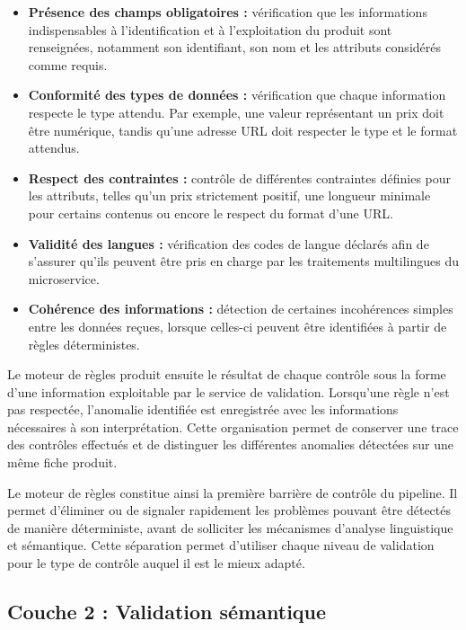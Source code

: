\begin{itemize}
    \item \textbf{Présence des champs obligatoires :} vérification que les informations indispensables à l'identification et à l'exploitation du produit sont renseignées, notamment son identifiant, son nom et les attributs considérés comme requis.

    \item \textbf{Conformité des types de données :} vérification que chaque information respecte le type attendu. Par exemple, une valeur représentant un prix doit être numérique, tandis qu'une adresse URL doit respecter le type et le format attendus.

    \item \textbf{Respect des contraintes :} contrôle de différentes contraintes définies pour les attributs, telles qu'un prix strictement positif, une longueur minimale pour certains contenus ou encore le respect du format d'une URL.

    \item \textbf{Validité des langues :} vérification des codes de langue déclarés afin de s'assurer qu'ils peuvent être pris en charge par les traitements multilingues du microservice.

    \item \textbf{Cohérence des informations :} détection de certaines incohérences simples entre les données reçues, lorsque celles-ci peuvent être identifiées à partir de règles déterministes.
\end{itemize}

Le moteur de règles produit ensuite le résultat de chaque contrôle sous la forme d'une information exploitable par le service de validation. Lorsqu'une règle n'est pas respectée, l'anomalie identifiée est enregistrée avec les informations nécessaires à son interprétation. Cette organisation permet de conserver une trace des contrôles effectués et de distinguer les différentes anomalies détectées sur une même fiche produit.

Le moteur de règles constitue ainsi la première barrière de contrôle du pipeline. Il permet d'éliminer ou de signaler rapidement les problèmes pouvant être détectés de manière déterministe, avant de solliciter les mécanismes d'analyse linguistique et sémantique. Cette séparation permet d'utiliser chaque niveau de validation pour le type de contrôle auquel il est le mieux adapté.

\subsection{Couche 2 : Validation sémantique}

